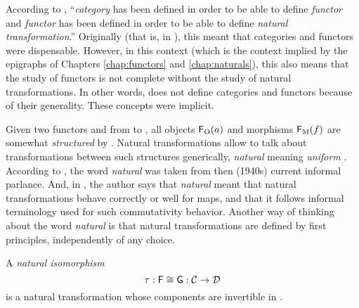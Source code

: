 \begin{remark}

  \label{re:category-functor-natural}

  According to \textcite[18]{maclane-1998}, ``\emph{category} has been
  defined in order to be able to define \emph{functor} and
  \emph{functor} has been defined in order to be able to define
  \emph{natural transformation}.'' Originally (that is, in
  \parencite{eilenberg-maclane-1942,eilenberg-maclane-1945}), this meant that categories
  and functors were dispensable. However, in this context (which is
  the context implied by the epigraphs of Chapters \ref{chap:functors}
  and \ref{chap:naturals}), this also means that the study of functors
  is not complete without the study of natural transformations. In
  other words, \parencite{eilenberg-maclane-1942} does not define categories and
  functors because of their generality. These concepts were implicit.

\end{remark}

\begin{remark}

  \label{re:natural}

  Given two functors  and  from  to ,
  all objects $\mathsf{F}_{\operatorname{O}}(a)$ and morphisms $\mathsf{F}_{\operatorname{M}}(f)$ are somewhat
  \emph{structured} by . Natural transformations allow to talk
  about transformations between such structures generically,
  \emph{natural} meaning \emph{uniform} \parencite[page
    77]{elkins-2009}. According to \parencite[page 30]{maclane-1998},
  the word \emph{natural} was taken from then (1940s) current informal
  parlance. And, in \parencite{maclane-2005}, the author says that
  \emph{natural} meant that natural transformations behave correctly
  or well for maps, and that it follows informal terminology used for
  such commutativity behavior. Another way of thinking about the word
  \emph{natural} is that natural transformations are defined by first
  principles, independently of any choice.

\end{remark}


\begin{definition}

  \label{def:natural-isomorphism}


  A \emph{natural isomorphism}
  \begin{equation*}
    \tau: \mathsf{F} \cong \mathsf{G}: \mathcal{C} \to \mathcal{D}
  \end{equation*}
  is a natural transformation whose components are invertible in
  .


\end{definition}

